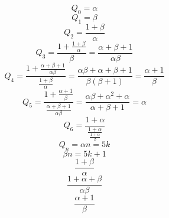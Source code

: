 \p
$$Q_0 = \alpha$$
$$Q_1 = \beta$$
$$Q_2 = \frac{1 + \beta}{\alpha}$$
$$Q_3 = \frac{1 + \frac{1 + \beta}{\alpha}}{\beta} = \frac{\alpha + \beta + 1}{\alpha \beta}$$
$$Q_4 = \frac{1 + \frac{\alpha + \beta + 1}{\alpha \beta}}{\frac{1 + \beta}{\alpha}} = \frac{\alpha \beta + \alpha + \beta + 1}{\beta(\beta + 1)} = \frac{\alpha + 1}{\beta}$$
$$Q_5 = \frac{1 + \frac{\alpha + 1}{\beta}}{\frac{\alpha + \beta + 1}{\alpha \beta}} = \frac{\alpha \beta + \alpha^2 + \alpha}{\alpha + \beta + 1} = \alpha$$
$$Q_6 = \frac{1 + \alpha}{\frac{1 + \alpha}{\frac{1 + \alpha}{\beta}}}$$
$$Q_n = \alpha n = 5k$$
$$\beta n = 5k + 1$$
$$\frac{1 + \beta}{\alpha}$$
$$\frac{1 + \alpha + \beta}{\alpha \beta}$$
$$\frac{\alpha + 1}{\beta}$$